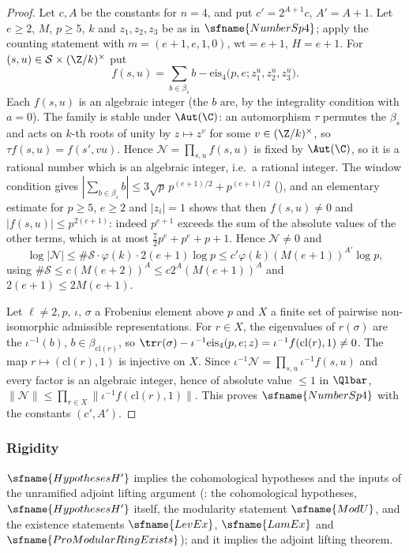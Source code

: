 \begin{proof}
Let $c,A$ be the constants for $n=4$, and put $c'=2^{A+1}c$, $A'=A+1$. Let $e\ge2$, $M$, $p\ge5$, $k$ and $z_1,z_2,z_3$
be as in $\sfname{NumberSp4}$; apply the counting statement with $m=(e+1,e,1,0)$, $\mathrm{wt}=e+1$, $H=e+1$. For
$(s,u)\in\mathcal S\times(\Z/k)^\times$ put
\[
 f(s,u)=\sum_{b\in\beta_s}b-\mathrm{eis}_4\bigl(p,e;z_1^u,z_2^u,z_3^u\bigr).
\]
Each $f(s,u)$ is an algebraic integer (the $b$ are, by the integrality condition with $a=0$). The family is stable
under $\Aut(\C)$: an automorphism $\tau$ permutes the $\beta_s$ and acts on $k$-th roots of unity by $z\mapsto z^v$ for some
$v\in(\Z/k)^\times$, so $\tau f(s,u)=f(s',vu)$. Hence $\mathcal N=\prod_{s,u}f(s,u)$ is fixed by $\Aut(\C)$, so it is a rational number which is an algebraic integer,
i.e.\ a rational integer. The window condition gives
$|\sum_{b\in\beta_s}b|\le3\sqrt p\,p^{(e+1)/2}+p^{(e+1)/2}$ (), and an
elementary estimate for $p\ge5$, $e\ge2$ and
$|z_i|=1$ shows that then $f(s,u)\ne0$ and $|f(s,u)|\le p^{2(e+1)}$: indeed $p^{e+1}$ exceeds the sum of the absolute
values of the other terms, which is at most $\frac72p^e+p^e+p+1$. Hence $\mathcal N\ne0$ and
\[
 \log|\mathcal N|\le\#\mathcal S\cdot\varphi(k)\cdot2(e+1)\log p\le c'\varphi(k)(M(e+1))^{A'}\log p,
\]
using $\#\mathcal S\le c(M(e+2))^A\le c2^A(M(e+1))^A$ and $2(e+1)\le2M(e+1)$.

Let $\ell\ne2,p$, $\iota$, $\sigma$ a Frobenius element above $p$ and $X$ a finite set of pairwise non-isomorphic
admissible representations. For $r\in X$, the eigenvalues of $r(\sigma)$ are the $\iota^{-1}(b)$, $b\in\beta_{\mathrm{cl}(r)}$,
so $\tr r(\sigma)-\iota^{-1}\mathrm{eis}_4(p,e;z)=\iota^{-1}f(\mathrm{cl}(r),1)\ne0$. The map $r\mapsto(\mathrm{cl}(r),1)$
is injective on $X$. Since $\iota^{-1}\mathcal N=\prod_{s,u}\iota^{-1}f(s,u)$ and every factor is an algebraic integer, hence
of absolute value $\le1$ in $\Qlbar$,
$\|\mathcal N\|\le\prod_{r\in X}\|\iota^{-1}f(\mathrm{cl}(r),1)\|$. This
proves $\sfname{NumberSp4}$ with the constants $(c',A')$.
\end{proof}

\subsubsection{Rigidity}

\begin{lemma}\label{pf:modularity:adjin}
$\sfname{HypothesesH'}$ implies the cohomological hypotheses and the inputs of the unramified adjoint lifting
argument (: the cohomological hypotheses, $\sfname{HypothesesH'}$ itself,
the modularity statement $\sfname{ModU}$, and the existence statements $\sfname{LevEx}$, $\sfname{LamEx}$ and
$\sfname{ProModularRingExists}$); and it implies the adjoint lifting theorem.
\end{lemma}

